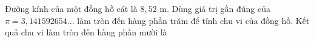 \begin{ex}
Đường kính của một đồng hồ cát là $8{,}52$ m. Dùng giá trị gần đúng của $\pi=3{,}141592654\ldots$ làm tròn đến hàng phần trăm để tính chu vi của đồng hồ. Kết quả chu vi làm tròn đến hàng phần mười là
\end{ex}
